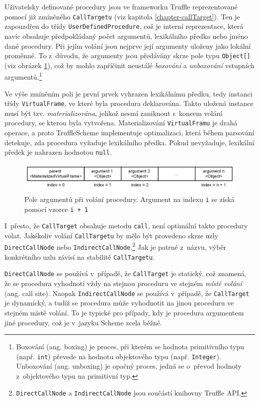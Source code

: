 \documentclass[
  master,
  biblatex,
  figures=true,
  theorems,
  sourcecodes,
  glossaries,
  index
]{kidiplom}
\begin{document}
Uživatelsky definované procedury jsou ve frameworku Truffle reprezentované pomocí již zmíněného \texttt{CallTargetu} (viz kapitola \ref{chapter-callTarget}). Ten je zapouzdřen do třídy \texttt{UserDefinedProcedure}, což je interní reprezentace, která navíc obsahuje předpokládaný počet argumentů, lexikálního předka nebo jméno dané procedury. Při jejím volání jsou nejprve její argumenty uloženy jako lokální proměnné. To z~důvodu, že argumenty jsou předávány skrze pole typu \texttt{Object[]} (viz obrázek \ref{fig:argument-array}), což by mohlo zapříčinit neustálé \textit{boxování} a \textit{unboxování} vstupních argumentů.\footnote{Boxování (ang. boxing) je proces, při kterém se hodnota primitivního typu (např. \texttt{int}) převede na hodnotu objektového typu (např. \texttt{Integer}). Unboxování (ang. unboxing) je opačný proces, jedná se o~převod hodnoty z~objektového typu na primitivní typ.}


Ve výše zmíněním poli je první prvek vyhrazen lexikálnímu předku, tedy instanci třídy \texttt{VirtualFrame}, ve které byla procedura deklarována. Takto uložená instance musí být tzv. \textit{materializována}, jelikož nesmí zaniknout s~koncem volání procedury, se kterou byla vytvořena. Materializování \texttt{VirtualFramu} je drahá operace, a proto TruffleScheme implementuje optimalizaci, která během parsování detekuje, zda procedura vyžaduje lexikálního předka. Pokud nevyžaduje, lexikální předek je nahrazen hodnotou \texttt{null}.


\begin{figure} [h]
    \centering
    \includegraphics[width= 1\textwidth]{images/argument-array.png}
    \caption{Pole argumentů při volání procedury. Argument na indexu \texttt{i} se získá pomocí vzorce \texttt{i + 1} }
    \label{fig:argument-array}
\end{figure}

I~přesto, že \texttt{CallTarget} obsahuje metodu \texttt{call}, není optimální takto procedury volat. Jakékoliv volání \texttt{CallTargetu} by mělo být provedeno skrze uzly \texttt{DirectCallNode} nebo \texttt{IndirectCallNode}.\footnote{\texttt{DirectCallNode} a \texttt{IndirectCallNode} jsou součástí knihovny Truffle API.} Jak je patrné z~názvu, výběr konkrétního uzlu závisí na stabilitě \texttt{CallTargetu}.

\texttt{DirectCallNode} se používá v~případě, že \texttt{CallTarget} je statický, což znamená, že se procedura vyhodnotí vždy na stejnou proceduru ve stejném \textit{místě volání} (ang. call site). Naopak \texttt{IndirectCallNode} se používá v~případě, že \texttt{CallTarget} je dynamický, a tudíž se procedura může vyhodnotit na jinou proceduru ve stejném místě volání. To je typické pro případy, kdy je procedura argumentem jiné procedury, což je v~jazyku Scheme zcela běžné. 
\end{document}
